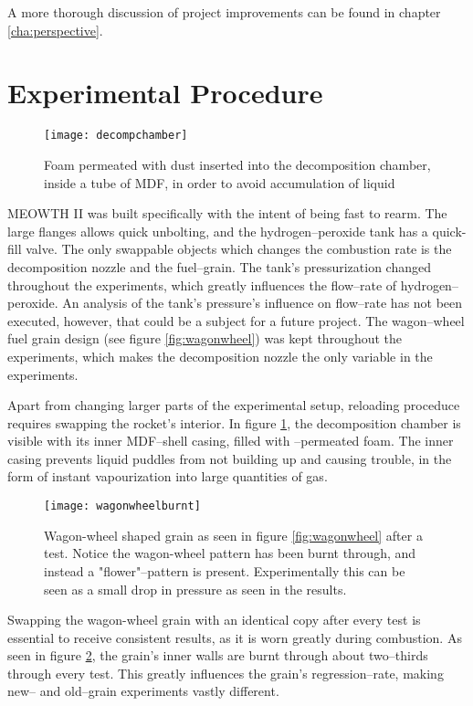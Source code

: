 	A more thorough discussion of project improvements can be found in chapter \ref{cha:perspective}.

	\section{Experimental Procedure}

	\begin{figure}
		\centering
		\texttt{[image: decompchamber]}
		\caption{Foam permeated with  dust inserted into the decomposition chamber, inside a tube of MDF, in order to avoid accumulation of liquid }
		\label{fig:kmno4foam2}
	\end{figure}

	MEOWTH II was built specifically with the intent of being fast to rearm. The large flanges allows quick unbolting, and the hydrogen--peroxide tank has a quick-fill valve. The only swappable objects which changes the combustion rate is the decomposition nozzle and the fuel--grain. The tank's pressurization changed throughout the experiments, which greatly influences the flow--rate of hydrogen--peroxide. An analysis of the tank's pressure's influence on flow--rate has not been executed, however, that could be a subject for a future project. The wagon--wheel fuel grain design (see figure \ref{fig:wagonwheel}) was kept throughout the experiments, which makes the decomposition nozzle the only variable in the experiments.

	Apart from changing larger parts of the experimental setup, reloading proceduce requires swapping the rocket's interior. In figure \ref{fig:kmno4foam2}, the decomposition chamber is visible with its inner MDF--shell casing, filled with --permeated foam. The inner casing prevents liquid puddles from not building up and causing trouble, in the form of instant vapourization into large quantities of gas.

	\begin{figure}
		\centering
		\texttt{[image: wagonwheelburnt]}
		\caption{Wagon-wheel shaped grain as seen in figure \ref{fig:wagonwheel} after a test. Notice the wagon-wheel pattern has been burnt through, and instead a "flower"--pattern is present. Experimentally this can be seen as a small drop in pressure as seen in the results.}
		\label{fig:burntgrain}
	\end{figure}

	Swapping the wagon-wheel grain with an identical copy after every test is essential to receive consistent results, as it is worn greatly during combustion. As seen in figure \ref{fig:burntgrain}, the grain's inner walls are burnt through about two--thirds through every test. This greatly influences the grain's regression--rate, making new-- and old--grain experiments vastly different.

